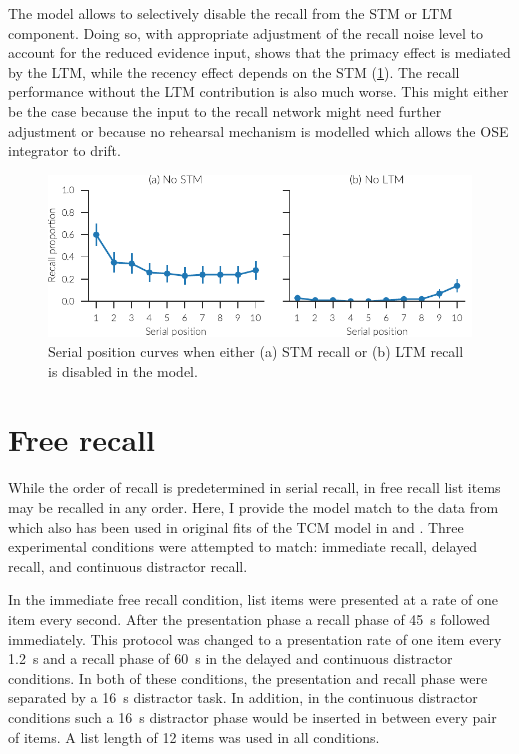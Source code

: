 The model allows to selectively disable the recall from the STM or LTM component.
Doing so, with appropriate adjustment of the recall noise level to account for the reduced evidence input, shows that the primacy effect is mediated by the LTM, while the recency effect depends on the STM (\cref{fig:results-no_xtm}).
The recall performance without the LTM contribution is also much worse.
This might either be the case because the input to the recall network might need further adjustment or because no rehearsal mechanism is modelled which allows the OSE integrator to drift.
\begin{figure}
    \centering
    \includegraphics{figures/results/no_xtm}
    \caption[Serial position curves with disabled STM/LTM]{Serial position curves when either (a) STM recall or (b) LTM recall is disabled in the model.}\label{fig:results-no_xtm}
\end{figure}


\section{Free recall}
While the order of recall is predetermined in serial recall, in free recall list items may be recalled in any order.
Here, I provide the model match to the data from \textcite{Howard1999} which also has been used in original fits of the TCM model in \textcite{Howard2002} and \textcite{Sederberg2008}.
Three experimental conditions were attempted to match: immediate recall, delayed recall, and continuous distractor recall.

In the immediate free recall condition, list items were presented at a rate of one item every second.
After the presentation phase a recall phase of \SI{45}{\second} followed immediately.
This protocol was changed to a presentation rate of one item every \SI{1.2}{\second} and a recall phase of \SI{60}{\second} in the delayed and continuous distractor conditions.
In both of these conditions, the presentation and recall phase were separated by a \SI{16}{\second} distractor task.
In addition, in the continuous distractor conditions such a \SI{16}{\second} distractor phase would be inserted in between every pair of items.
A list length of 12 items was used in all conditions.

